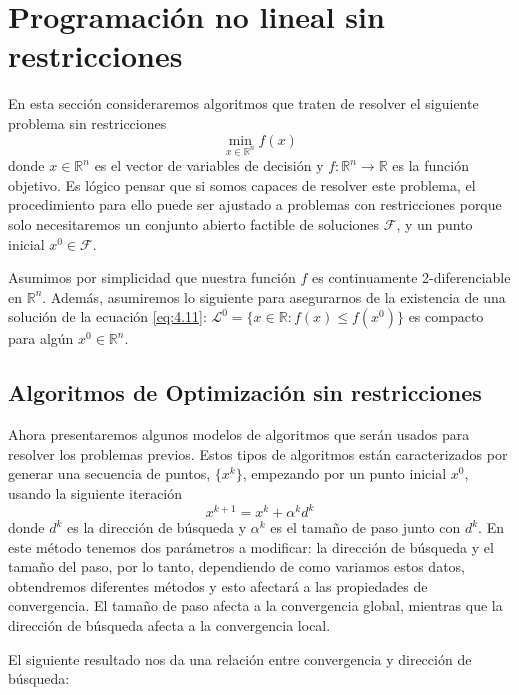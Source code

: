 \section{Programación no lineal sin restricciones}

En esta sección consideraremos algoritmos que traten de resolver el siguiente problema sin restricciones
\begin{equation}
\min_{x\in\mathbb{R}^n}f(x) 
\label{eq:4.11}
\end{equation}
donde $x\in\mathbb{R}^n$ es el vector de variables de decisión y $f:\mathbb{R}^n\xrightarrow{}{}\mathbb{R}$ es la función objetivo. 
Es lógico pensar que si somos capaces de resolver este problema, el procedimiento para ello puede ser ajustado a problemas con restricciones porque solo necesitaremos un conjunto abierto factible de soluciones $\mathcal{F}$, y un punto inicial $x^0\in\mathcal{F}$.

Asumimos por simplicidad que nuestra función $f$ es continuamente 2-diferenciable en $\mathbb{R}^n$. 
Además, asumiremos lo siguiente para asegurarnos de la existencia de una solución de la ecuación \ref{eq:4.11}: $\mathcal{L}^0 = \{x\in\mathbb{R}:f(x)\leq f(x^0)\}$ es compacto para algún $x^0\in\mathbb{R}^n$.

\subsection{Algoritmos de Optimización sin restricciones}

Ahora presentaremos algunos modelos de algoritmos que serán usados para resolver los problemas previos. 
Estos tipos de algoritmos están caracterizados por generar una secuencia de puntos, $\{x^k\}$, empezando por un punto inicial $x^0$, usando la siguiente iteración
\begin{equation}
x^{k+1} = x^k + \alpha^kd^k
\label{eq:4.12}
\end{equation}
donde $d^k$ es la dirección de búsqueda y $\alpha^k$ es el tamaño de paso junto con $d^k$. 
En este método tenemos dos parámetros a modificar: la dirección de búsqueda y el tamaño del paso, por lo tanto, dependiendo de como variamos estos datos, obtendremos diferentes métodos y esto afectará a las propiedades de convergencia. 
El tamaño de paso afecta a la convergencia global, mientras que la dirección de búsqueda afecta a la convergencia local. 

El siguiente resultado nos da una relación entre convergencia y dirección de búsqueda:

